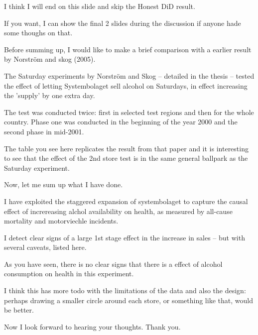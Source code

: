 \documentclass[12pt]{article}
\begin{document}
I think I will end on this slide and skip the Honest DiD result. 

If you want, I can show the final 2 slides during the discussion if anyone hade some thoughs on that.

Before summing up, I would like to make a brief comparison with a earlier result by Norström and skog (2005). 

The Saturday experiments by Norström and Skog -- detailed in the thesis --  tested the effect of letting Systembolaget sell alcohol on Saturdays, in effect increasing the 'supply' by one extra day. 

The test was conducted twice: first in selected test regions and then for the whole country. Phase one was conducted in the beginning of the year 2000 and the second phase in mid-2001. 

The table you see here replicates the result from that paper and it is interesting to see that the effect of the 2nd store test is in the same general ballpark as the Saturday experiment.

Now, let me sum up what I have done.

I have exploited the staggered expansion of systembolaget to capture the causal effect of increreasing alchol availability on health, as measured by all-cause mortality and motorviechle incidents. 

I detect clear signs of a large 1st stage effect in the increase in sales -- but with several caveats, listed here.

As you have seen, there is no clear signs that there is a effect of alcohol consumption on health in this experiment. 

I think this has more todo with the limitations of the data and also the design: perhaps drawing a smaller circle around each store, or something like that, would be better.

Now I look forward to hearing your thoughts. Thank you.
 
\end{document}
